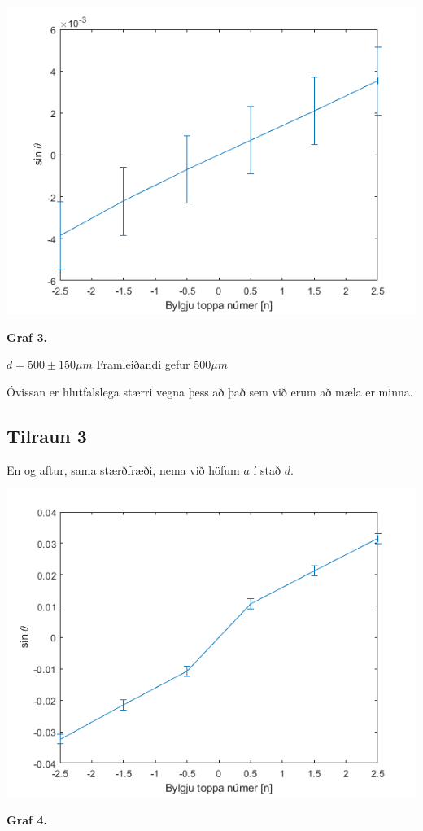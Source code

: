 \documentclass[12pt]{article}
\begin{document}
\begin{center}
    \includegraphics[scale=0.5]{html/data_03.png}
    
    \bf Graf 3.
\end{center}

$d = 500 \pm 150 \mu m$
Framleiðandi gefur $500 \mu m$

Óvissan er hlutfalslega stærri vegna þess að það sem við erum að mæla er minna.


\subsection{Tilraun 3}

En og aftur, sama stærðfræði, nema við höfum $a$ í stað $d$.

\begin{center}
    \includegraphics[scale=0.5]{html/data_04.png}
    
    \bf Graf 4.
\end{center}
\end{document}
